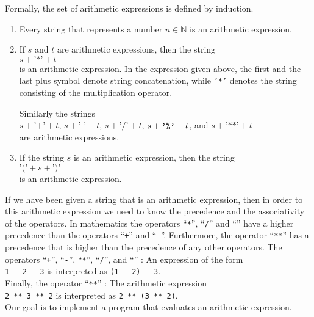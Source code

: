 Formally, the set of arithmetic expressions is defined by induction.
\begin{enumerate}
\item Every string that represents a number $n \in \mathbb{N}$ is an arithmetic expression.
\item If $s$ and $t$ are arithmetic expressions, then the string
      \\[0.2cm]
      \hspace*{1.3cm}
      $s+\texttt{'*'}+t$
      \\[0.2cm]
      is an arithmetic expression.  In the expression given above, the first and the last plus symbol
      denote string concatenation, while \texttt{'*'} denotes the string consisting of the multiplication
      operator. 

      Similarly the strings  
      \\[0.2cm]
      \hspace*{1.3cm}
      $s + \texttt{'+'} + t$, \quad $s + \texttt{'-'} + t$, \quad
      $s + \texttt{'/'} + t$, \quad $s + \texttt{'\symbol{37}'} + t$, \quad and \quad $s +\texttt{'**'} + t$
      \\[0.2cm]
      are arithmetic expressions.
\item If the string $s$ is an arithmetic expression, then the string
      \\[0.2cm]
      \hspace*{1.3cm}
      $\texttt{'('}+ s + \texttt{')'}$ 
      \\[0.2cm]
      is an arithmetic expression.
\end{enumerate}
If we have been given a string that is an arithmetic expression, then in order to  this
arithmetic expression we need to know the precedence and the associativity of the operators.
In mathematics the operators ``\texttt{*}'', ``\texttt{/}'' and ``\texttt{}'' have a
higher precedence than the operators ``\texttt{+}'' and ``\texttt{-}''.  Furthermore, the operator
  ``\texttt{**}'' has a precedence that is higher than the precedence
 of any other operators.  The operators
``\texttt{+}'', ``\texttt{-}'', ``\texttt{*}'', ``\texttt{/}'', and ``\texttt{}''
:  An expression of the form 
\\[0.2cm]
\hspace*{1.3cm} 
\texttt{1 - 2 - 3} \quad is interpreted as \quad \texttt{(1 - 2) - 3}.
 \\[0.2cm]
Finally, the operator ``\texttt{**}'' :
The arithmetic expression \\[0.2cm]
\hspace*{1.3cm} 
\texttt{2 \texttt{**} 3 \texttt{**}  2} \quad is interpreted as \quad 
\texttt{2 \texttt{**} (3 \texttt{**} 2)}. 
\\[0.2cm]
Our goal is to implement a program that evaluates an arithmetic expression.


